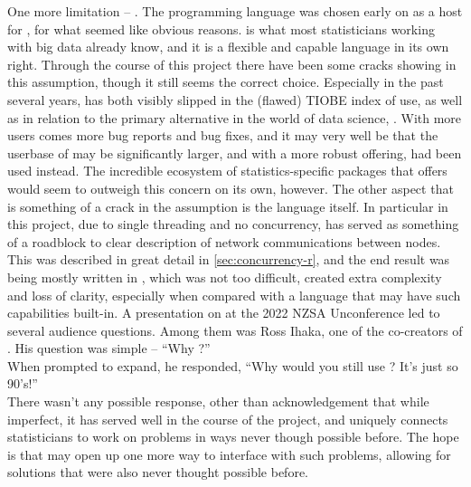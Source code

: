 One more limitation -- \R{}.
The \R{} programming language was chosen early on as a host for \lsr{}, for what seemed like obvious reasons.
\R{} is what most statisticians working with big data already know, and it is a flexible and capable language in its own right.
Through the course of this project there have been some cracks showing in this assumption, though it still seems the correct choice.
Especially in the past several years, \R{} has both visibly slipped in the (flawed) TIOBE index of use, as well as in relation to the primary alternative in the world of data science, .
With more users comes more bug reports and bug fixes, and it may very well be that the userbase of \lsr{} may be significantly larger, and with a more robust offering, had  been used instead.
The incredible ecosystem of statistics-specific packages that \R{} offers would seem to outweigh this concern on its own, however.
The other aspect that is something of a crack in the assumption is the language itself.
In particular in this project, due to single threading and no concurrency, \R{} has served as something of a roadblock to clear description of network communications between nodes.
This was described in great detail in \cref{sec:concurrency-r}, and the end result was \orcv being mostly written in , which was not too difficult, created extra complexity and loss of clarity, especially when compared with a language that may have such capabilities built-in.
A presentation on \lsr{} at the 2022 NZSA Unconference led to several audience questions.
Among them was Ross Ihaka, one of the co-creators of \R{}.
His question was simple -- ``Why \R{}?''\\
When prompted to expand, he responded, ``Why would you still use \R{}? It's just so 90's!''\\
There wasn't any possible response, other than acknowledgement that while imperfect, it has served well in the course of the project, and uniquely connects statisticians to work on problems in ways never though possible before.
The hope is that \lsr{} may open up one more way to interface with such problems, allowing for solutions that were also never thought possible before.
